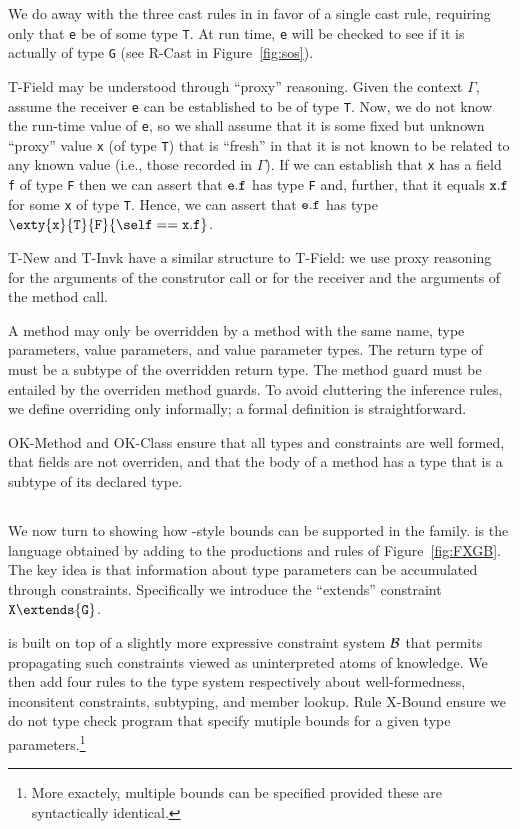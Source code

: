 We do away with the three cast rules in \FJ{} in favor of a single
cast rule, requiring only that {\tt e} be of some type {\tt T}. At run time,
{\tt e} will be checked to see if it is actually of type {\tt G} (see
{\sc R-Cast} in Figure~\ref{fig:sos}).

{\sc T-Field} may be understood through ``proxy'' reasoning.
Given the context $\Gamma$, assume the receiver {\tt e} can
be established to be of type {\tt T}. Now, we do not know the run-time
value of {\tt e}, so we shall assume that it is some fixed but unknown
``proxy'' value {\tt x} (of type {\tt T}) that is ``fresh'' in that it
is not known to be related to any known value (i.e., those recorded
in $\Gamma$).  If we can establish that {\tt x} has a field {\tt f} of
type {\tt F} then we can assert that
${\tt e}.{\tt f}$ has type {\tt F} and, further, that it equals ${\tt x}.{\tt f}$
for some {\tt x} of type {\tt T}.
Hence, we can assert that ${\tt e}.{\tt f}$ has type 
$\exty{\tt x}{\tt T}{\tt F}\{\self=={\tt x}.{\tt f}\}$.

{\sc T-New} and {\sc T-Invk} have a similar structure to {\sc T-Field}: we use
proxy reasoning for the arguments of the construtor call or for the receiver and the arguments of the method
call.

A method may only be overridden by a method with the same name, type parameters, value parameters, and value parameter types. The return type of must be a subtype of the overridden return type. The method guard must be entailed by the overriden method guards. To avoid cluttering the inference rules, we define overriding only informally; a formal definition is straightforward.

{\sc OK-Method} and {\sc OK-Class} ensure that all types and constraints are well formed, that fields are not overriden, and that the body of a method has a type that is a subtype of its declared type.


\subsection{}
We now turn to showing how \FGJ{}-style bounds can be supported in the \FXGL{\cdot} family.
 is the language obtained by adding to \FXGL{\cdot} the productions and rules of Figure~\ref{fig:FXGB}.
The key idea is that information about type parameters can be accumulated through constraints. Specifically we introduce the ``extends'' constraint \mbox{${\tt X}\extends{\tt G}$}.

 is built on top of a slightly more expressive constraint system $\cal B$ that permits propagating such constraints viewed as uninterpreted atoms of knowledge. We then add four rules to the type system respectively about well-formedness, inconsitent constraints, subtyping, and member lookup. Rule {\sc X-Bound} ensure we do not type check program that specify mutiple bounds for a given type parameters.\footnote{More exactely, multiple bounds can be specified provided these are syntactically identical.}

